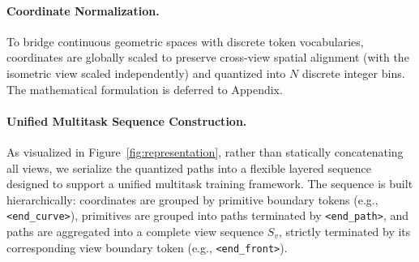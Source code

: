\documentclass{article}
\begin{document}
\begin{table}[h]
\centering
\caption{Vocabulary of structural boundary tokens and their geometric semantics.}
\label{tab:vocabulary}
\end{table}





\paragraph{Coordinate Normalization.} 
To bridge continuous geometric spaces with discrete token vocabularies, coordinates are globally scaled to preserve cross-view spatial alignment (with the isometric view scaled independently) and quantized into $N$ discrete integer bins. The mathematical formulation is deferred to Appendix.

\paragraph{Unified Multitask Sequence Construction.} As visualized in Figure~\ref{fig:representation}, rather than statically concatenating all views, we serialize the quantized paths into a flexible layered sequence designed to support a unified multitask training framework. The sequence is built hierarchically: coordinates are grouped by primitive boundary tokens (e.g., \texttt{<end\_curve>}), primitives are grouped into paths terminated by \texttt{<end\_path>}, and paths are aggregated into a complete view sequence $S_v$, strictly terminated by its corresponding view boundary token (e.g., \texttt{<end\_front>}).
\end{document}
